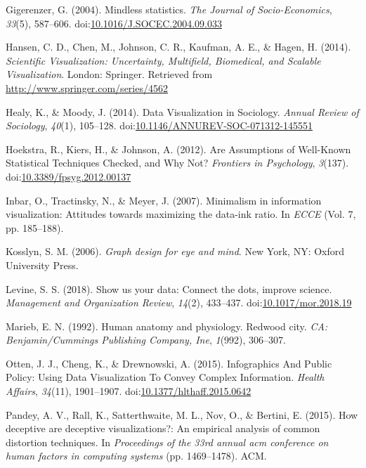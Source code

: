\documentclass[
  man]{apa6}
\newlength{\cslhangindent}
\newenvironment{cslreferences}%
  {\setlength{\parindent}{0pt}%
  \everypar{\setlength{\hangindent}{\cslhangindent}}\ignorespaces}%
  {\par}
\begin{document}
\begin{cslreferences}
\leavevmode\hypertarget{ref-Gigerenzer2004}{}%
Gigerenzer, G. (2004). Mindless statistics. \emph{The Journal of Socio-Economics}, \emph{33}(5), 587--606. doi:\href{https://doi.org/10.1016/J.SOCEC.2004.09.033}{10.1016/J.SOCEC.2004.09.033}

\leavevmode\hypertarget{ref-Hansen}{}%
Hansen, C. D., Chen, M., Johnson, C. R., Kaufman, A. E., \& Hagen, H. (2014). \emph{Scientific Visualization: Uncertainty, Multifield, Biomedical, and Scalable Visualization}. London: Springer. Retrieved from \url{http://www.springer.com/series/4562}

\leavevmode\hypertarget{ref-Healy2014a}{}%
Healy, K., \& Moody, J. (2014). Data Visualization in Sociology. \emph{Annual Review of Sociology}, \emph{40}(1), 105--128. doi:\href{https://doi.org/10.1146/ANNUREV-SOC-071312-145551}{10.1146/ANNUREV-SOC-071312-145551}

\leavevmode\hypertarget{ref-hoekstra_are_2012}{}%
Hoekstra, R., Kiers, H., \& Johnson, A. (2012). Are Assumptions of Well-Known Statistical Techniques Checked, and Why Not? \emph{Frontiers in Psychology}, \emph{3}(137). doi:\href{https://doi.org/10.3389/fpsyg.2012.00137}{10.3389/fpsyg.2012.00137}

\leavevmode\hypertarget{ref-inbar2007minimalism}{}%
Inbar, O., Tractinsky, N., \& Meyer, J. (2007). Minimalism in information visualization: Attitudes towards maximizing the data-ink ratio. In \emph{ECCE} (Vol. 7, pp. 185--188).

\leavevmode\hypertarget{ref-Kosslyn2006e}{}%
Kosslyn, S. M. (2006). \emph{Graph design for eye and mind}. New York, NY: Oxford University Press.

\leavevmode\hypertarget{ref-Levine2018}{}%
Levine, S. S. (2018). Show us your data: Connect the dots, improve science. \emph{Management and Organization Review}, \emph{14}(2), 433--437. doi:\href{https://doi.org/10.1017/mor.2018.19}{10.1017/mor.2018.19}

\leavevmode\hypertarget{ref-marieb1992human}{}%
Marieb, E. N. (1992). Human anatomy and physiology. Redwood city. \emph{CA: Benjamin/Cummings Publishing Company, Ine}, \emph{1}(992), 306--307.

\leavevmode\hypertarget{ref-Otten2015}{}%
Otten, J. J., Cheng, K., \& Drewnowski, A. (2015). Infographics And Public Policy: Using Data Visualization To Convey Complex Information. \emph{Health Affairs}, \emph{34}(11), 1901--1907. doi:\href{https://doi.org/10.1377/hlthaff.2015.0642}{10.1377/hlthaff.2015.0642}

\leavevmode\hypertarget{ref-pandey2015deceptive}{}%
Pandey, A. V., Rall, K., Satterthwaite, M. L., Nov, O., \& Bertini, E. (2015). How deceptive are deceptive visualizations?: An empirical analysis of common distortion techniques. In \emph{Proceedings of the 33rd annual acm conference on human factors in computing systems} (pp. 1469--1478). ACM.


\end{cslreferences}
\end{document}

